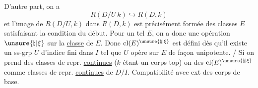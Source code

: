 D'autre part, on a
\[
R(D/U\ k)\hookrightarrow R(D,k)
\]
et l'image de $R(D/U,k)$ dans $R(D,k)$ est précisément formée des classes  $E$ satisfaisant la condition du début. Pour un tel $E$, on a donc une opération $\unsure{\natural|\xi}$ sur la \uline{classe} de $E$. Donc $\operatorname{cl}(E)^{\unsure{\natural|\xi}}$ est défini dès qu'il existe un ss-grp  $U$ d'indice fini dans $I$ tel que  $U$ opère sur $E$ de façon unipotente. / Si on prend des classes de repr. \uline{continues} ($k$ étant un corps top) on   des \deleted{$\unsure{=}$} $\operatorname{cl}(E)^{\unsure{\natural|\xi}}$ comme classes de repr. \uline{continues} de $D/I$. Compatibilité avec ext des corps de base.




